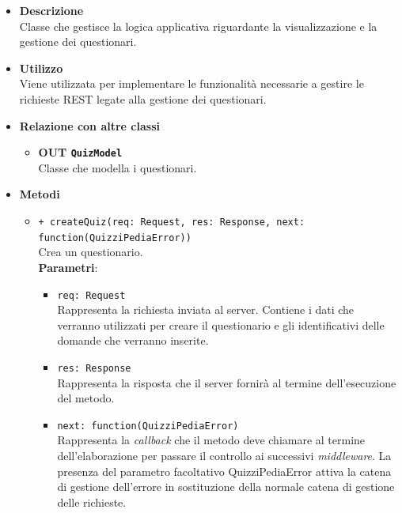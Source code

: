 \begin{itemize}
	\item \textbf{Descrizione} \\
	Classe che gestisce la logica applicativa riguardante la visualizzazione e la gestione dei questionari.
	\item \textbf{Utilizzo} \\
	Viene utilizzata per implementare le funzionalità necessarie a gestire le richieste REST legate alla gestione dei questionari.
	\item \textbf{Relazione con altre classi}\\
	\begin{itemize}
			\item \textbf{OUT \texttt{QuizModel}} \\
			Classe che modella i questionari.
	\end{itemize}
	\item \textbf{Metodi}\\
	\begin{itemize}
		\item \texttt{+ createQuiz(req: Request, res: Response, next: function(QuizziPediaError))}\\
		Crea un questionario.\\
		\textbf{Parametri}:
		\begin{itemize}
			\item \texttt{req: Request}\\
			Rappresenta la richiesta inviata al server. Contiene i dati che verranno utilizzati per creare il questionario e gli identificativi delle domande che verranno inserite.
			\item \texttt{res: Response}\\
			Rappresenta la risposta che il server fornirà al termine dell'esecuzione del metodo.
			\item \texttt{next: function(QuizziPediaError)}\\
			Rappresenta la \textit{callback} che il metodo deve chiamare al termine dell'elaborazione per passare il controllo ai successivi \textit{middleware}. La presenza del parametro facoltativo QuizziPediaError attiva la catena di gestione dell'errore in sostituzione della normale catena di gestione delle richieste.
		\end{itemize}
	

\end{itemize}
\end{itemize}
